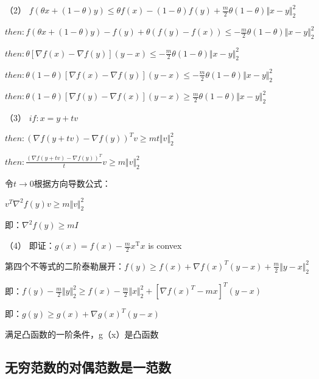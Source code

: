 \documentclass[12pt, a4paper, oneside, fontset=windows]{ctexart}
\begin{document}
（2）
$f(\theta x+\left ( 1-\theta  \right )y)\leq \theta f\left ( x \right )-\left ( 1-\theta  \right )f\left ( y \right )+\frac{m}{2} \theta \left ( 1-\theta  \right )\Vert x-y \Vert _2^{2}$

$then:f(\theta x+\left ( 1-\theta  \right )y)-f\left ( y \right )+\theta \left ( f\left ( y \right )-f\left ( x \right ) \right )\leq -\frac{m}{2} \theta \left ( 1-\theta  \right )\Vert x-y \Vert _2^{2}$

$then:\theta \left [ \nabla f\left ( x \right )-\nabla f\left ( y \right ) \right ]\left ( y-x \right )\leq -\frac{m}{2} \theta \left ( 1-\theta  \right )\Vert x-y \Vert _2^{2}$

$then:\theta \left ( 1-\theta  \right )\left [ \nabla f\left ( x \right )-\nabla f\left ( y \right ) \right ]\left ( y-x \right )\leq -\frac{m}{2} \theta \left ( 1-\theta  \right )\Vert x-y \Vert _2^{2}$

$then:\theta \left ( 1-\theta  \right )\left [ \nabla f\left ( y \right )-\nabla f\left ( x \right ) \right ]\left ( y-x \right )\geq \frac{m}{2} \theta \left ( 1-\theta  \right )\Vert x-y \Vert _2^{2}$


（3）
$if:x=y+tv$

$then:\left (  \nabla f\left ( y+tv \right )-\nabla f\left ( y \right )\right )^{T}v\geq mt \Vert v \Vert_{2}^{2}$

$then:\frac{\left (  \nabla f\left ( y+tv \right )-\nabla f\left ( y \right )\right )^{T}}{t}v\geq m \Vert v \Vert_{2}^{2}$

令$t \rightarrow 0$根据方向导数公式：

$v^{T} \nabla ^{2}f\left ( y \right )v\geq m\Vert v \Vert_{2}^{2}$

即：$ \nabla ^{2}f\left ( y \right )\geq mI$

（4）
即证：$g\left ( x \right )=f\left ( x \right )-\frac{m}{2}x ^\mathrm{T}x$ is convex

第四个不等式的二阶泰勒展开：$f\left ( y \right )\geq f\left ( x \right )+\nabla f\left (x\right )^{T}\left ( y-x \right )+\frac{m}{2} \Vert y-x \Vert_{2}^{2}$

即：$f\left ( y \right )-\frac{m}{2} \Vert y\Vert_{2}^{2}\geq f\left ( x \right )-\frac{m}{2} \Vert x \Vert_{2}^{2}+\left [  \nabla f\left (x\right )^{T}-mx\right ]^{T}\left ( y-x \right )$

即：$g\left ( y \right )\geq g\left ( x \right )+ \nabla g\left ( x \right )^{T} \left ( y-x \right )$

满足凸函数的一阶条件，g（x）是凸函数
\subsection{无穷范数的对偶范数是一范数}
\end{document}
